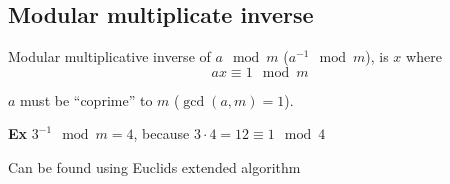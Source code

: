 
\subsection{Modular multiplicate inverse}
Modular multiplicative inverse of $a \mod m$ ($a^{-1} \mod m$), is $x$ where
\[
ax \equiv 1 \mod m
\]

$a$ must be ``coprime'' to $m$ ($\gcd(a, m) = 1$).

\textbf{Ex} $3^{-1} \mod m = 4$, because $3 \cdot 4 = 12 \equiv 1 \mod
4$

Can be found using Euclids extended algorithm
